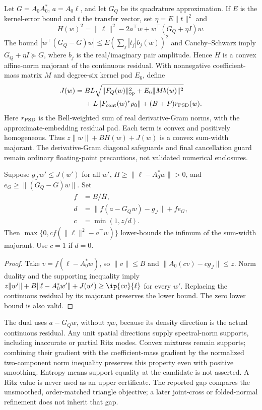 Let $G=A_0A_0^*$, $a=A_0\ell$, and let $G_Q$ be its quadrature approximation.
If $E$ is the kernel-error bound and $t$ the transfer vector, set
$\eta=E\|t\|^2$ and
\[
 H(w)^2=\|\ell\|^2-2a^\top w+w^\top(G_Q+\eta I)w.
\]
The bound $|w^\top(G_Q-G)w|\le E(\sum_j|t_j|b_j(w))^2$
and Cauchy--Schwarz imply $G_Q+\eta I\succeq G$, where $b_j$ is the
real/imaginary pair amplitude. Hence $H$ is a convex affine-norm majorant of
the continuous residual. With nonnegative coefficient-mass matrix $M$ and
degree-six kernel pad $E_6$, define
\[
\begin{aligned}
 J(w)={}&BL\sqrt{\|F_Q(w)\|_{\rm op}^2+E_6\|Mb(w)\|^2}\\
       &+L\|F_{\rm cont}(w)^*\rho_0\|+(B+P)r_{\rm PSD}(w).
\end{aligned}
\]
Here $r_{\rm PSD}$ is the Bell-weighted sum of real derivative-Gram norms,
with the approximate-embedding residual pad. Each term is convex and positively
homogeneous. Thus $z\|w\|+BH(w)+J(w)$ is a convex sum-width majorant.
The derivative-Gram diagonal safeguards and final cancellation guard remain
ordinary floating-point precautions, not validated numerical enclosures.

\begin{samepage}
\begin{proposition}
Suppose $g_J^\top w'\le J(w')$ for all $w'$, $\bar H\ge\|\ell-A_0^*w\|>0$,
and $e_G\ge\|(G_Q-G)w\|$. Set
\[
\begin{aligned}
 f&=B/\bar H,\\
 d&=\|f(a-G_Qw)-g_J\|+fe_G,\\
 c&=\min(1,z/d).
\end{aligned}
\]
Then $\max\{0,cf(\|\ell\|^2-a^\top w)\}$ lower-bounds the infimum of the
sum-width majorant. Use $c=1$ if $d=0$.
\end{proposition}
\end{samepage}
\begin{proof}
Take $v=f(\ell-A_0^*w)$, so $\|v\|\le B$ and
$\|A_0(cv)-cg_J\|\le z$. Norm duality and the supporting inequality imply
$z\|w'\|+B\|\ell-A_0^*w'\|+J(w')\ge\ip{cv}{\ell}$ for every $w'$.
Replacing the continuous residual by its majorant preserves the lower bound.
The zero lower bound is also valid.
\end{proof}
The dual uses $a-G_Qw$, without $\eta w$, because its density direction is the
actual continuous residual. Any unit spatial directions supply spectral-norm
supports, including inaccurate or partial Ritz modes. Convex mixtures remain
supports; combining their gradient with the coefficient-mass gradient by the
normalized two-component norm inequality preserves this property even with
positive smoothing. Entropy means support equality at the candidate is not
asserted. A Ritz value is never used as an upper certificate. The reported gap
compares the unsmoothed, order-matched triangle objective; a later joint-cross
or folded-normal refinement does not inherit that gap.

